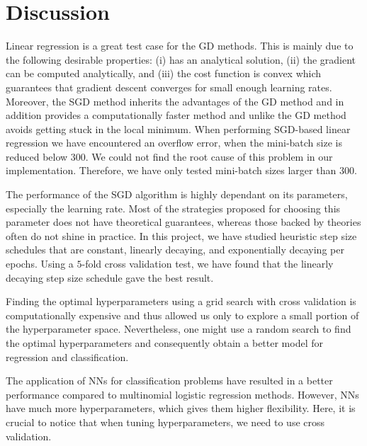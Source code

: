 \documentclass[a4paper]{article}
\begin{document}
\section{Discussion}
Linear regression is a great test case for the GD methods. This is mainly due to the following desirable properties: (i) has an analytical solution, (ii) the gradient can be computed analytically, and (iii) the cost function is convex which guarantees that gradient descent converges for small enough learning rates. Moreover, the SGD method inherits the advantages of the GD method and in addition provides a computationally faster method and unlike the GD method avoids getting stuck in the local minimum.  When performing SGD-based linear regression we have encountered an overflow error, when the mini-batch size is reduced below $300$. We could not find the root cause of this problem in our implementation. Therefore, we have only tested mini-batch sizes larger than $300$.

The performance of the SGD algorithm is highly dependant on its parameters, especially the learning rate. Most of the strategies proposed for choosing this parameter does not have theoretical guarantees, whereas those backed by theories often do not shine in practice. In this project, we have studied heuristic step size schedules that are constant, linearly decaying, and exponentially decaying per epochs. Using a $5$-fold cross validation test, we have found that the linearly decaying step size schedule gave the best result.

Finding the optimal hyperparameters using a grid search with cross validation is computationally expensive and thus allowed us only to explore a small portion of the hyperparameter space. Nevertheless, one might use a random search to find the optimal hyperparameters and consequently obtain a better model for regression and classification.

The application of NNs for classification problems have resulted in a better performance compared to multinomial logistic regression methods. However, NNs have much more hyperparameters, which gives them higher flexibility. Here, it is crucial to notice that when tuning hyperparameters, we need to use cross validation.
\end{document}
